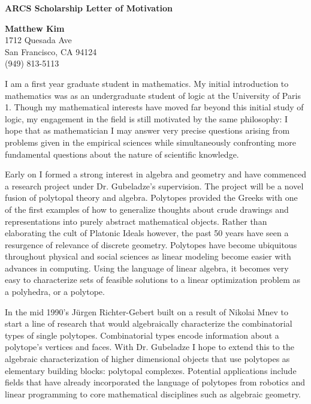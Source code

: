 \documentclass[11pt]{letter} %
\begin{document}
\signature{Matthew Cadier Kim}
\setlength\parindent{24pt}                  %
 
\begin{letter}{\bf ARCS Scholarship Letter of Motivation} 

\begin{center}
\large{\bf Matthew Kim}\\
1712 Quesada Ave\\ San Francisco, CA 94124\\ (949) 813-5113
\end{center} 
\vfill %

\opening{} 



\quad \quad I am a first year graduate student in mathematics. My initial introduction to mathematics was as an undergraduate student of logic at the University of Paris 1.  Though  my mathematical interests have moved far beyond this initial study of logic, my engagement in the field is still motivated by the same philosophy: I hope that as mathematician I may answer very precise questions arising from problems given in the empirical sciences while simultaneously confronting more fundamental questions about the nature of scientific knowledge.
 
Early on I formed a strong interest in algebra and geometry and have commenced a research project under Dr. Gubeladze's supervision. The project will be a novel fusion of polytopal theory and algebra.  Polytopes provided the Greeks with one of the first examples of how to generalize thoughts about crude drawings and representations into purely abstract mathematical objects.  Rather than elaborating the cult of Platonic Ideals however, the past 50 years have seen a resurgence of relevance of discrete geometry. Polytopes have become ubiquitous throughout physical and social sciences as linear modeling become easier with advances in computing.  Using the language of linear algebra, it becomes very easy to characterize sets of feasible solutions to a linear optimization problem as a polyhedra, or a polytope. 

In the mid 1990's J\"urgen Richter-Gebert built on a result of Nikolai Mnev to start a line of research that would algebraically characterize the combinatorial types of single polytopes.  Combinatorial types encode information about a polytope's vertices and faces.  With Dr. Gubeladze I hope to extend this to the algebraic characterization of higher dimensional objects that use polytopes as elementary building blocks: polytopal complexes. Potential applications include fields that have already incorporated the language of polytopes from robotics and linear programming to core mathematical disciplines such as 
algebraic geometry. 


\end{letter}
\end{document}
